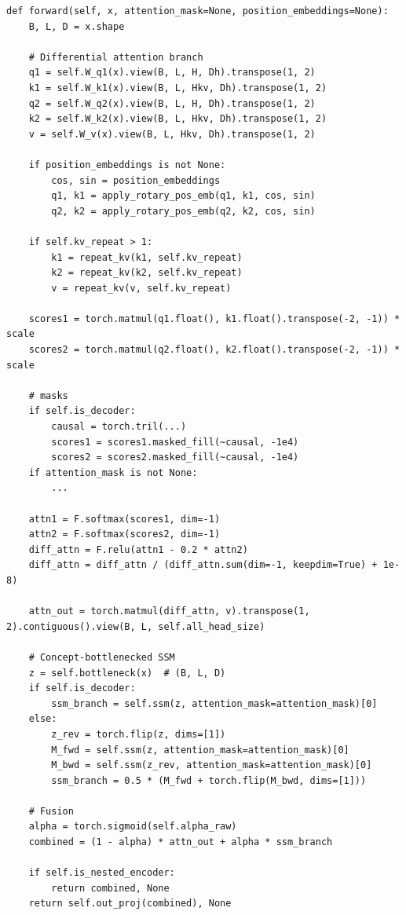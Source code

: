 \begin{lstlisting}
def forward(self, x, attention_mask=None, position_embeddings=None):
    B, L, D = x.shape
    
    # Differential attention branch
    q1 = self.W_q1(x).view(B, L, H, Dh).transpose(1, 2)
    k1 = self.W_k1(x).view(B, L, Hkv, Dh).transpose(1, 2)
    q2 = self.W_q2(x).view(B, L, H, Dh).transpose(1, 2)
    k2 = self.W_k2(x).view(B, L, Hkv, Dh).transpose(1, 2)
    v = self.W_v(x).view(B, L, Hkv, Dh).transpose(1, 2)
    
    if position_embeddings is not None:
        cos, sin = position_embeddings
        q1, k1 = apply_rotary_pos_emb(q1, k1, cos, sin)
        q2, k2 = apply_rotary_pos_emb(q2, k2, cos, sin)
    
    if self.kv_repeat > 1:
        k1 = repeat_kv(k1, self.kv_repeat)
        k2 = repeat_kv(k2, self.kv_repeat)
        v = repeat_kv(v, self.kv_repeat)
    
    scores1 = torch.matmul(q1.float(), k1.float().transpose(-2, -1)) * scale
    scores2 = torch.matmul(q2.float(), k2.float().transpose(-2, -1)) * scale
    
    # masks
    if self.is_decoder:
        causal = torch.tril(...)
        scores1 = scores1.masked_fill(~causal, -1e4)
        scores2 = scores2.masked_fill(~causal, -1e4)
    if attention_mask is not None:
        ...
    
    attn1 = F.softmax(scores1, dim=-1)
    attn2 = F.softmax(scores2, dim=-1)
    diff_attn = F.relu(attn1 - 0.2 * attn2)
    diff_attn = diff_attn / (diff_attn.sum(dim=-1, keepdim=True) + 1e-8)
    
    attn_out = torch.matmul(diff_attn, v).transpose(1, 2).contiguous().view(B, L, self.all_head_size)
    
    # Concept-bottlenecked SSM
    z = self.bottleneck(x)  # (B, L, D)
    if self.is_decoder:
        ssm_branch = self.ssm(z, attention_mask=attention_mask)[0]
    else:
        z_rev = torch.flip(z, dims=[1])
        M_fwd = self.ssm(z, attention_mask=attention_mask)[0]
        M_bwd = self.ssm(z_rev, attention_mask=attention_mask)[0]
        ssm_branch = 0.5 * (M_fwd + torch.flip(M_bwd, dims=[1]))
    
    # Fusion
    alpha = torch.sigmoid(self.alpha_raw)
    combined = (1 - alpha) * attn_out + alpha * ssm_branch
    
    if self.is_nested_encoder:
        return combined, None
    return self.out_proj(combined), None
\end{lstlisting}


